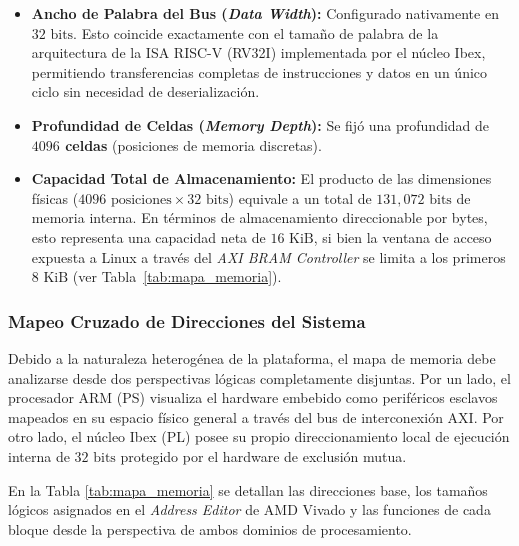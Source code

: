 \begin{itemize}
    \item \textbf{Ancho de Palabra del Bus (\textit{Data Width}):} Configurado nativamente en \textbf{$32\text{ bits}$}. Esto coincide exactamente con el tamaño de palabra de la arquitectura de la ISA RISC-V (RV32I) implementada por el núcleo Ibex, permitiendo transferencias completas de instrucciones y datos en un único ciclo sin necesidad de deserialización.
    \item \textbf{Profundidad de Celdas (\textit{Memory Depth}):} Se fijó una profundidad de \textbf{$4096$ celdas} (posiciones de memoria discretas).
     \item \textbf{Capacidad Total de Almacenamiento:} El producto de las dimensiones físicas ($4096 \text{ posiciones} \times 32 \text{ bits}$) equivale a un total de $131{,}072\text{ bits}$ de memoria interna. En términos de almacenamiento direccionable por bytes, esto representa una capacidad neta de \textbf{$16\text{ KiB}$}, si bien la ventana de acceso expuesta a Linux a través del \textit{AXI BRAM Controller} se limita a los primeros $8\text{ KiB}$ (ver Tabla~\ref{tab:mapa_memoria}).

\end{itemize}

\subsubsection{Mapeo Cruzado de Direcciones del Sistema}
\label{sssec:memory_map}

Debido a la naturaleza heterogénea de la plataforma, el mapa de memoria debe analizarse desde dos perspectivas lógicas completamente disjuntas. Por un lado, el procesador ARM (PS) visualiza el hardware embebido como periféricos esclavos mapeados en su espacio físico general a través del bus de interconexión AXI. Por otro lado, el núcleo Ibex (PL) posee su propio direccionamiento local de ejecución interna de $32\text{ bits}$ protegido por el hardware de exclusión mutua.

En la Tabla \ref{tab:mapa_memoria} se detallan las direcciones base, los tamaños lógicos asignados en el \textit{Address Editor} de AMD Vivado y las funciones de cada bloque desde la perspectiva de ambos dominios de procesamiento.

